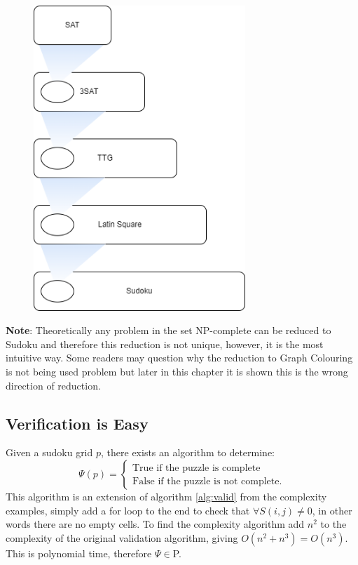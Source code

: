 \documentclass[a4paper,11pt]{report}
\begin{document}
\begin{figure}[h!]
\begin{center}
\includegraphics[width=80mm]{figures/subset.png}
\end{center}
\caption{\label{fig:sudokureduction}}
\end{figure}

\textbf{Note}: Theoretically any problem in the set NP-complete can be reduced to Sudoku and therefore this reduction is not unique, however, it is the most intuitive way. Some readers may question why the reduction to Graph Colouring is not being used problem but later in this chapter it is shown this is the wrong direction of reduction.

\subsection{Verification is Easy}

Given a sudoku grid $p$, there exists an algorithm to determine:
\begin{equation}
\Psi(p) = \begin{cases} 
\text{True if the puzzle is complete} \\
\text{False if the puzzle is not complete}.
\end{cases}
\end{equation}
This algorithm is an extension of algorithm \ref{alg:valid} from the complexity examples, simply add a for loop to the end to check that $\forall S(i,j) \neq 0 $, in other words there are no empty cells. To find the complexity algorithm add $n^2$ to the complexity of the original validation algorithm, giving $O(n^2+n^3)=O(n^3)$. This is polynomial time, therefore $\Psi\in $P.
\end{document}
